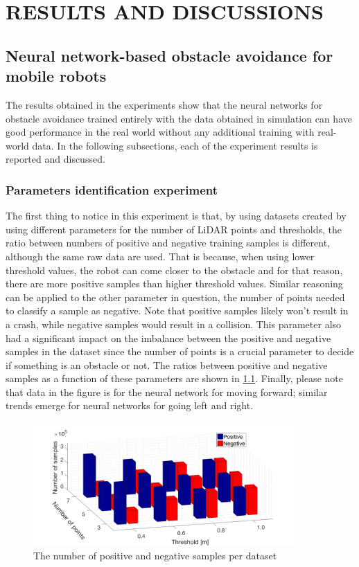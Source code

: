 \chapter{RESULTS AND DISCUSSIONS}
\label{chap:Results}

\section{Neural network-based obstacle avoidance for mobile robots}

The results obtained in the experiments show that the neural networks for obstacle avoidance trained entirely with the data obtained in simulation can have good performance in the real world without any additional training with real-world data. In the following subsections, each of the experiment results is reported and discussed.

\subsection{Parameters identification experiment}\label{Sec:ResLabelling}

The first thing to notice in this experiment is that, by using datasets created by using different parameters for the number of LiDAR points and thresholds, the ratio between numbers of positive and negative training samples is different, although the same raw data are used. That is because, when using lower threshold values, the robot can come closer to the obstacle and for that reason, there are more positive samples than higher threshold values. Similar reasoning can be applied to the other parameter in question, the number of points needed to classify a sample as negative. Note that positive samples likely won't result in a crash, while negative samples would result in a collision. This parameter also had a significant impact on the imbalance between the positive and negative samples in the dataset since the number of points is a crucial parameter to decide if something is an obstacle or not. The ratios between positive and negative samples as a function of these parameters are shown in \cref{fig:Brojevi}. Finally, please note that data in the figure is for the neural network for moving forward; similar trends emerge for neural networks for going left and right.

\begin{figure}
\centering
\includegraphics[width=0.9\textwidth]{slike/brojevi}
\caption{The number of positive and negative samples per dataset}
\label{fig:Brojevi}
\end{figure}

